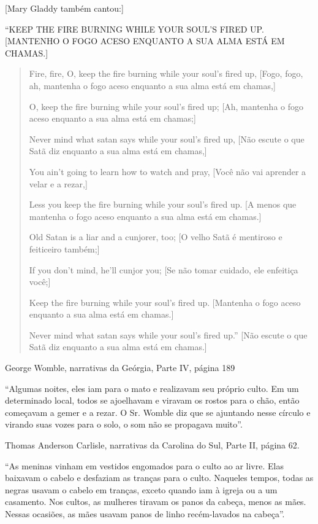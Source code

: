 {[}Mary Gladdy também cantou:{]}

``KEEP THE FIRE BURNING WHILE YOUR SOUL'S FIRED UP. {[}MANTENHO O FOGO
ACESO ENQUANTO A SUA ALMA ESTÁ EM CHAMAS.{]}

\begin{quote}
Fire, fire, O, keep the fire burning while your soul's fired up,
{[}Fogo, fogo, ah, mantenha o fogo aceso enquanto a sua alma está em
chamas,{]}

O, keep the fire burning while your soul's fired up; {[}Ah, mantenha o
fogo aceso enquanto a sua alma está em chamas;{]}

Never mind what satan says while your soul's fired up, {[}Não escute o
que Satã diz enquanto a sua alma está em chamas,{]}

You ain't going to learn how to watch and pray, {[}Você não vai aprender
a velar e a rezar,{]}

Less you keep the fire burning while your soul's fired up. {[}A menos
que mantenha o fogo aceso enquanto a sua alma está em chamas.{]}

Old Satan is a liar and a cunjorer, too; {[}O velho Satã é mentiroso e
feiticeiro também;{]}

If you don't mind, he'll cunjor you; {[}Se não tomar cuidado, ele
enfeitiça você;{]}

Keep the fire burning while your soul's fired up. {[}Mantenha o fogo
aceso enquanto a sua alma está em chamas.{]}

Never mind what satan says while your soul's fired up.'' {[}Não escute o
que Satã diz enquanto a sua alma está em chamas.{]}
\end{quote}

George Womble, narrativas da Geórgia, Parte IV, página 189

``Algumas noites, eles iam para o mato e realizavam seu próprio culto.
Em um determinado local, todos se ajoelhavam e viravam os rostos para o
chão, então começavam a gemer e a rezar. O Sr. Womble diz que se
ajuntando nesse círculo e virando suas vozes para o solo, o som não se
propagava muito''.

Thomas Anderson Carlisle, narrativas da Carolina do Sul, Parte II,
página 62.

``As meninas vinham em vestidos engomados para o culto ao ar livre. Elas
baixavam o cabelo e desfaziam as tranças para o culto. Naqueles tempos,
todas as negras usavam o cabelo em tranças, exceto quando iam à igreja
ou a um casamento. Nos cultos, as mulheres tiravam os panos da cabeça,
menos as mães. Nessas ocasiões, as mães usavam panos de linho
recém-lavados na cabeça''.

